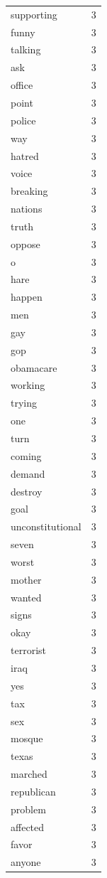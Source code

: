 \begin{tabular}{lr}
supporting & 3 \\
funny & 3 \\
talking & 3 \\
ask & 3 \\
office & 3 \\
point & 3 \\
police & 3 \\
way & 3 \\
hatred & 3 \\
voice & 3 \\
breaking & 3 \\
nations & 3 \\
truth & 3 \\
oppose & 3 \\
o & 3 \\
hare & 3 \\
happen & 3 \\
men & 3 \\
gay & 3 \\
gop & 3 \\
obamacare & 3 \\
working & 3 \\
trying & 3 \\
one & 3 \\
turn & 3 \\
coming & 3 \\
demand & 3 \\
destroy & 3 \\
goal & 3 \\
unconstitutional & 3 \\
seven & 3 \\
worst & 3 \\
mother & 3 \\
wanted & 3 \\
signs & 3 \\
okay & 3 \\
terrorist & 3 \\
iraq & 3 \\
yes & 3 \\
tax & 3 \\
sex & 3 \\
mosque & 3 \\
texas & 3 \\
marched & 3 \\
republican & 3 \\
problem & 3 \\
affected & 3 \\
favor & 3 \\
anyone & 3 \\

\end{tabular}
